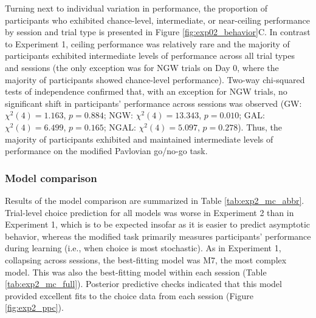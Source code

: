 \documentclass[a4paper,12pt]{article}
\begin{document}
\begin{refsection}[main]
Turning next to individual variation in performance, the proportion of participants who exhibited chance-level, intermediate, or near-ceiling performance by session and trial type is presented in Figure \ref{fig:exp02_behavior}C. In contrast to Experiment 1, ceiling performance was relatively rare and the majority of participants exhibited intermediate levels of performance across all trial types and sessions (the only exception was for NGW trials on Day 0, where the majority of participants showed chance-level performance). Two-way chi-squared tests of independence confirmed that, with an exception for NGW trials, no significant shift in participants' performance across sessions was observed (GW: $\chi^2 (4) = 1.163$, $p = 0.884$; NGW: $\chi^2 (4) = 13.343$, $p = 0.010$; GAL: $\chi^2 (4) = 6.499$, $p = 0.165$; NGAL: $\chi^2 (4) = 5.097$, $p = 0.278$). Thus, the majority of participants exhibited and maintained intermediate levels of performance on the modified Pavlovian go/no-go task.

\subsubsection*{Model comparison}

Results of the model comparison are summarized in Table \ref{tab:exp2_mc_abbr}. Trial-level choice prediction for all models was worse in Experiment 2 than in Experiment 1, which is to be expected insofar as it is easier to predict asymptotic behavior, whereas the modified task primarily measures participants' performance during learning (i.e., when choice is most stochastic). As in Experiment 1, collapsing across sessions, the best-fitting model was M7, the most complex model. This was also the best-fitting model within each session (Table \ref{tab:exp2_mc_full}). Posterior predictive checks indicated that this model provided excellent fits to the choice data from each session (Figure \ref{fig:exp2_ppc}). 


\end{refsection}
\end{document}
